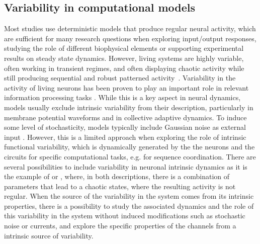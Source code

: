 \subsection{Variability in computational models}

Most studies use deterministic models that produce regular neural activity, which are sufficient for many research questions when exploring input/output responses, studying the role of different biophysical elements or supporting experimental results on steady state dynamics. However, living systems are highly variable, often working in transient regimes, and often displaying chaotic activity while still producing sequential and robust patterned activity~\parencite{selverston_reliable_2000}. Variability in the activity of living neurons has been proven to play an important role in relevant information processing tasks \parencite{ding_dynamic_2011,renart_variability_2014,masquelier_neural_2013,hutt_intrinsic_2023,ribeiro_trialbytrial_2024}. While this is a key aspect in neural dynamics, models usually exclude intrinsic variability from their description,  particularly in membrane potential waveforms and in collective adaptive dynamics. To induce some level of stochasticity, models typically include Gaussian noise as external input \parencite{linaro_accurate_2011,pezo_diffusion_2014,zheng_spontaneous_2020}. However, this is a limited approach when exploring the role of intrinsic functional variability, which is dynamically generated by the the neurons and the circuits for specific computational tasks, e.g. for sequence coordination. There are several possibilities to include variability in neuronal intrinsic dynamics as it is the example of \textcite{hindmarsh_model_1984} or \textcite{komendantov_deterministic_1996}, where, in both descriptions, there is a combination of parameters that lead  to a chaotic states, where the resulting activity is not regular. When the source of the variability in the system comes from its intrinsic properties, there is a possibility to study the associated dynamics and the role of this variability in the system without induced modifications such as stochastic noise or currents, and explore the specific properties of the channels from a intrinsic source of variability. 


